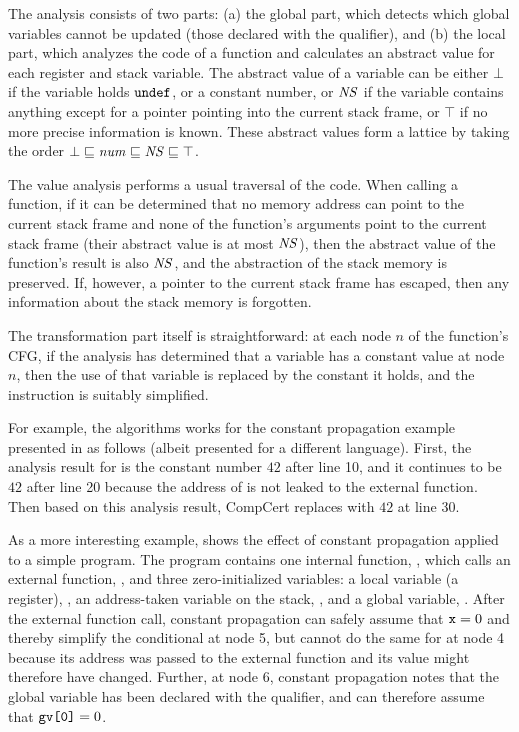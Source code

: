 The analysis consists of two parts: 
(a) the global part, which detects which global variables cannot be updated (\ie those declared with the  qualifier), and
(b) the local part, which analyzes the code of a function and calculates an abstract value for each register and stack variable.
The abstract value of a variable can be either $\bot$ if the variable holds $\mathtt{undef}$, 
or a constant number, 
or $\mathit{NS}$ if the variable contains anything except for a pointer pointing into the current stack frame, 
or $\top$ if no more precise information is known.
These abstract values form a lattice by taking the order $\bot \sqsubseteq \mathit{num} \sqsubseteq \mathit{NS} \sqsubseteq \top$.


The value analysis performs a usual traversal of the code. 
When calling a function, 
if it can be determined that no memory address can point to the current stack frame 
and none of the function's arguments point to the current stack frame (\ie their abstract value is at most $\mathit{NS}$), 
then the abstract value of the function's result is also $\mathit{NS}$, and the abstraction of the stack memory is preserved.
If, however, a pointer to the current stack frame has escaped, then any information about the stack memory is forgotten.

The transformation part itself is straightforward: 
at each node $n$ of the function's CFG, if the analysis has determined that a variable has a constant value at node $n$,
then the use of that variable is replaced by the constant it holds, and the instruction is suitably simplified.

For example, the algorithms works for the constant propagation example presented in
 as follows (albeit presented for a different language).  First, the
analysis result for  is the constant number $42$ after line 10, and it continues to be $42$
after line 20 because the address of  is not leaked to the external function.  Then based on
this analysis result, CompCert replaces  with $42$ at line 30.

As a more interesting example, 
 shows the effect of constant propagation applied to a simple program.
The program contains one internal function, , which calls an external function, ,
and three zero-initialized variables: 
a local variable (a register), , 
an address-taken variable on the stack, ,
and a global variable, .
After the external function call, 
constant propagation can safely assume that $\texttt{x}=0$ and thereby simplify the conditional at node 5,
but cannot do the same for  at node 4
because its address was passed to the external function and its value might therefore have changed.
Further, at node 6, 
constant propagation notes that the global variable  has been declared with the  qualifier,
and can therefore assume that $\texttt{gv[0]}=0$.


